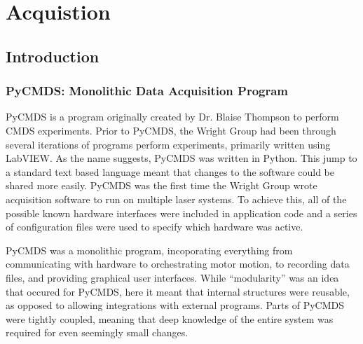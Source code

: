 \chapter{Acquistion} \label{cha:acq}

\newcommand\biab{\texttt{bluesky-in-a-box} }
\newcommand\wrightfakes{\texttt{wright-fakes} }
\newcommand\wrightplans{\texttt{wright-plans} }
\newcommand\blueskycmds{\texttt{bluesky-cmds} }
\newcommand\yaqccmds{\texttt{yaqc-cmds}}
\newcommand\yaqcqtpy{\texttt{yaqc-qtpy}}

\clearpage

\section{Introduction}

\subsection{PyCMDS: Monolithic Data Acquisition Program}


\Gls{PyCMDS} is a program originally created by Dr. Blaise Thompson to perform \gls{CMDS} experiments\cite{PyCMDS0.8.0}.
Prior to PyCMDS, the Wright Group had been through several iterations of programs perform experiments, primarily written using LabVIEW\cite{KainSchuyler2017a}\cite{MeyerKentAlbert2004b}.
As the name suggests, PyCMDS was written in Python.
This jump to a standard text based language meant that changes to the software could be shared more easily.
PyCMDS was the first time the Wright Group wrote acquisition software to run on multiple laser systems.
To achieve this, all of the possible known hardware interfaces were included in application code and a series of configuration files were used to specify which hardware was active.

PyCMDS was a monolithic program, incoporating everything from communicating with hardware to orchestrating motor motion, to recording data files, and providing graphical user interfaces.
While ``modularity'' was an idea that occured for PyCMDS, here it meant that internal structures were reusable, as opposed to allowing integrations with external programs.
Parts of PyCMDS were tightly coupled, meaning that deep knowledge of the entire system was required for even seemingly small changes.

